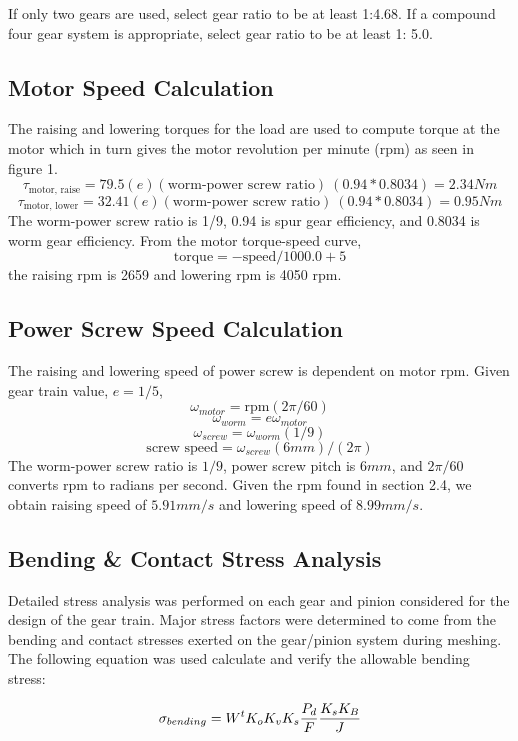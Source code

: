 \documentclass[letterpaper,12pt]{article}
\begin{document}
\noindent If only two gears are used, select gear ratio to be at least 1:4.68. If a compound four gear system is appropriate, select gear ratio to be at least 1: 5.0.

\subsection{Motor Speed Calculation}
The raising and lowering torques for the load are used to compute torque at the motor which in turn gives the motor revolution per minute (rpm) as seen in figure 1. 
$$\tau_{\text{motor, raise}} = 79.5 (e)(\text{worm-power screw ratio}) \ (0.94*0.8034) = 2.34 Nm$$
$$\tau_{\text{motor, lower}} = 32.41 (e)(\text{worm-power screw ratio}) \ (0.94*0.8034) = 0.95 Nm$$
The worm-power screw ratio is 1/9, 0.94 is spur gear efficiency, and 0.8034 is worm gear efficiency. From the motor torque-speed curve, $$\text{torque} = -\text{speed}/1000.0+5$$ the raising rpm is 2659 and lowering rpm is 4050 rpm. 

\subsection{Power Screw Speed Calculation}
The raising and lowering speed of power screw is dependent on motor rpm. Given gear train value, $e = 1/5$, 
$$\omega_{motor} = \text{rpm} (2\pi/60)$$
$$\omega_{worm} = e \omega_{motor}$$
$$\omega_{screw} = \omega_{worm} (1/9)$$
$$\text{screw speed} = \omega_{screw}(6mm)/ (2 \pi)$$
The worm-power screw ratio is $1/9$, power screw pitch is $6mm$, and $2\pi/60$ converts rpm to radians per second. Given the rpm found in section 2.4, we obtain raising speed of $5.91 mm/s$ and lowering speed of $8.99 mm/s$.

\subsection{Bending \& Contact Stress Analysis}

Detailed stress analysis was performed on each gear and pinion considered for the design of the gear train. Major stress factors were determined to come from the bending and contact stresses exerted on the gear/pinion system during meshing. The following equation was used calculate and verify the allowable bending stress:

\begin{equation}
\sigma_{bending} = W^t K_o K_v K_s \frac{P_d}{F}\frac{K_s K_B}{J} \\
\end{equation}
\end{document}
